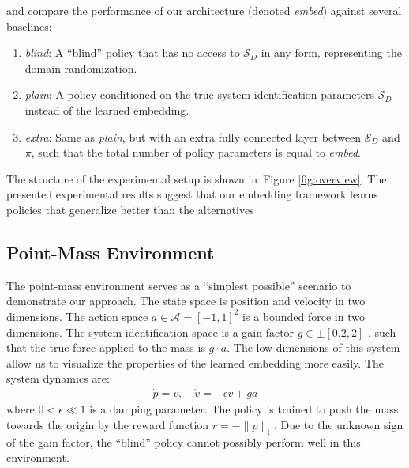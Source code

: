 \documentclass{article}
\newcommand{\TODO}[1]{}
\newcommand{\cA}{\mathcal{A}}
\newcommand{\cS}{\mathcal{S}}
\newcommand{\blind}{\emph{blind}}
\newcommand{\plain}{\emph{plain}}
\newcommand{\extra}{\emph{extra}}
\newcommand{\embed}{\emph{embed}}
\newcommand{\traj}{\emph{traj}}
\newcommand{\figref}[1]{Figure \ref{#1}}
\begin{document}
and compare the performance of our architecture (denoted \embed) against several baselines:
\begin{enumerate}
\item \blind: A ``blind'' policy that has no access to $\cS_D$ in any form, representing the domain randomization.
\item \plain: A policy conditioned on the true system identification parameters $\cS_D$ instead of the learned embedding.
\item \extra: Same as \plain, but with an extra fully connected layer between $\cS_D$ and $\pi$, such that the total number of policy parameters is equal to \embed.
\end{enumerate}
The structure of the experimental setup is shown in~\figref{fig:overview}.
The presented experimental results suggest that our embedding framework learns policies that generalize better than the alternatives \TODO{fingers crossed.}

\subsection{Point-Mass Environment}
\label{pointmass}
The point-mass environment serves as a ``simplest possible'' scenario to demonstrate our approach.
The state space is position and velocity in two dimensions.
The action space $a \in \cA = [-1, 1]^2$ is a bounded force in two dimensions.
The system identification space is a gain factor $g \in \pm[0.2, 2]$ \TODO{match code}.
such that the true force applied to the mass is $g \cdot a$.
The low dimensions of this system allow us to visualize the properties of the learned embedding more easily.
The system dynamics are:
\begin{equation}\begin{split}
\dot p = v, \quad \dot v = -\epsilon v + ga
\end{split}\end{equation}
where $0 < \epsilon \ll 1$ is a damping parameter.
The policy is trained to push the mass towards the origin
by the reward function $r = -\|p\|_1$.
Due to the unknown sign of the gain factor, the ``blind'' policy cannot possibly perform well in this environment.
\end{document}
